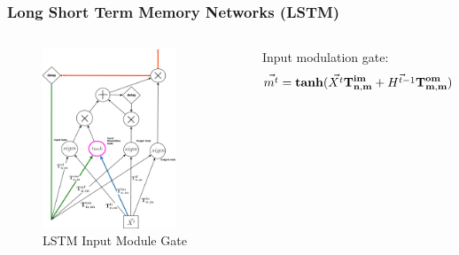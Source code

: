 \documentclass{beamer}
\begin{document}
\begin{frame}
\frametitle{Long Short Term Memory Networks (LSTM)}
\begin{columns}
\begin{figure}[t!]
    \centering
    \includegraphics[width=0.8\textwidth]{./pictures/figures/LSTM_input_module_gate.png}
    \caption{LSTM Input Module Gate}
    \label{fig:LSTM_input_gate}
\end{figure}

Input modulation gate:
$$\vec{m^t} = \bold{tanh}(\vec{X^t}\bold{T_{n,m}^{im}} + \vec{H^{t-1}}\bold{T_{m,m}^{om}})$$
\end{columns}
\end{frame}
\end{document}
